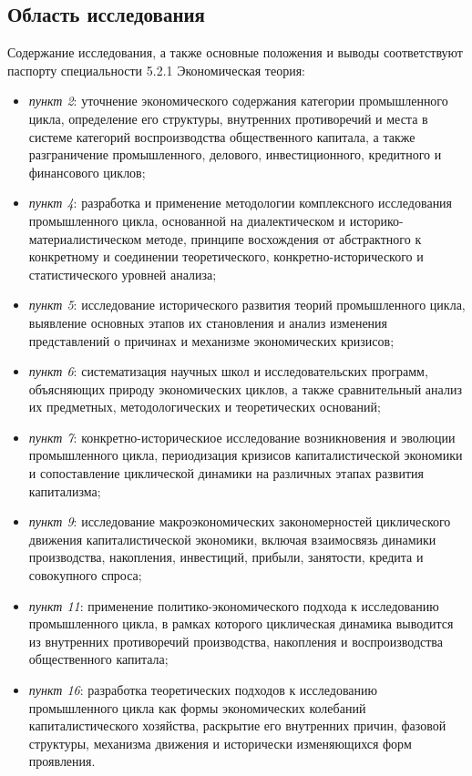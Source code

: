 \subsection*{Область исследования}
Содержание исследования, а также основные положения и выводы соответствуют паспорту специальности 5.2.1 \textquotedbl{}Экономическая теория\textquotedbl{}:
\begin{itemize}
    \item \textit{пункт 2}: уточнение экономического содержания категории промышленного цикла, определение его структуры, внутренних противоречий и места в системе категорий воспроизводства общественного капитала, а также разграничение промышленного, делового, инвестиционного, кредитного и финансового циклов;
    \item \textit{пункт 4}: разработка и применение методологии комплексного исследования промышленного цикла, основанной на диалектическом и историко-материалистическом методе, принципе восхождения от абстрактного к конкретному и соединении теоретического, конкретно-исторического и статистического уровней анализа;
    \item \textit{пункт 5}: исследование исторического развития теорий промышленного цикла, выявление основных этапов их становления и анализ изменения представлений о причинах и механизме экономических кризисов;
    \item \textit{пункт 6}: систематизация научных школ и исследовательских программ, объясняющих природу экономических циклов, а также сравнительный анализ их предметных, методологических и теоретических оснований;
    \item \textit{пункт 7}: конкретно-историческиое исследование возникновения и эволюции промышленного цикла, периодизация кризисов капиталистической экономики и сопоставление циклической динамики на различных этапах развития капитализма;
    \item \textit{пункт 9}: исследование макроэкономических закономерностей циклического движения капиталистической экономики, включая взаимосвязь динамики производства, накопления, инвестиций, прибыли, занятости, кредита и совокупного спроса;
    \item \textit{пункт 11}: применение политико-экономического подхода к исследованию промышленного цикла, в рамках которого циклическая динамика выводится из внутренних противоречий производства, накопления и воспроизводства общественного капитала;
    \item \textit{пункт 16}: разработка теоретических подходов к исследованию промышленного цикла как формы экономических колебаний капиталистического хозяйства, раскрытие его внутренних причин, фазовой структуры, механизма движения и исторически изменяющихся форм проявления.
\end{itemize}

